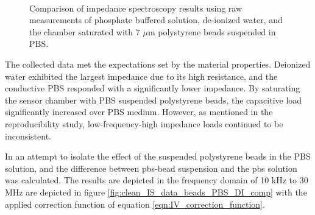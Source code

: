 \begin{figure}[h]
\begin{subfigure}[b]{0.9\textwidth}
    \end{subfigure}
    \\
    \caption[PBS, DI, microbead IS Raw data comparison.]{Comparison of impedance spectroscopy results using raw measurements of phosphate buffered solution, de-ionized water, and the chamber saturated with 7 $\mu$m polystyrene beads suspended in PBS.}
    \label{fig:IS_data_beads_pbs_DI_comp}
\end{figure}


\par The collected data met the expectations set by the material properties. Deionized water exhibited the largest impedance due to its high resistance, and the conductive PBS responded with a significantly lower impedance. By saturating the sensor chamber with PBS suspended polystyrene beads, the capacitive load significantly increased over PBS medium. However, as mentioned in the reproducibility study, low-frequency-high impedance loads continued to be inconsistent.

\par In an attempt to isolate the effect of the suspended polystyrene beads in the PBS solution, and the difference between pbs-bead suspension and the pbs solution was calculated. The results are depicted in the frequency domain of 10 kHz to 30 MHz are depicted in figure \ref{fig:clean_IS_data_beads_PBS_DI_comp} with the applied correction function of equation \ref{eqn:IV_correction_function}.


